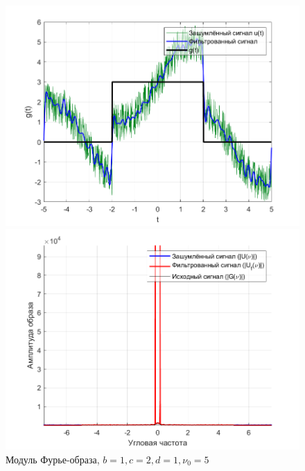 \documentclass[a4paper]{article}
\begin{document}
\begin{figure}[H]
    \begin{minipage}{0.5\textwidth}
        \centering
        \includegraphics[width=\textwidth]{part2/1_2_1.png}
        \caption{$b = 1, c = 2, d = 1, \nu_0 = 5$}
    \end{minipage}    
    \begin{minipage}{0.5\textwidth}
        \centering
        \includegraphics[width=\textwidth]{part2/1_2_1_Fourier.png}
        \caption{Модуль Фурье-образа, $b = 1, c = 2, d = 1, \nu_0 = 5$}
    \end{minipage}
\end{figure}\
\end{document}
